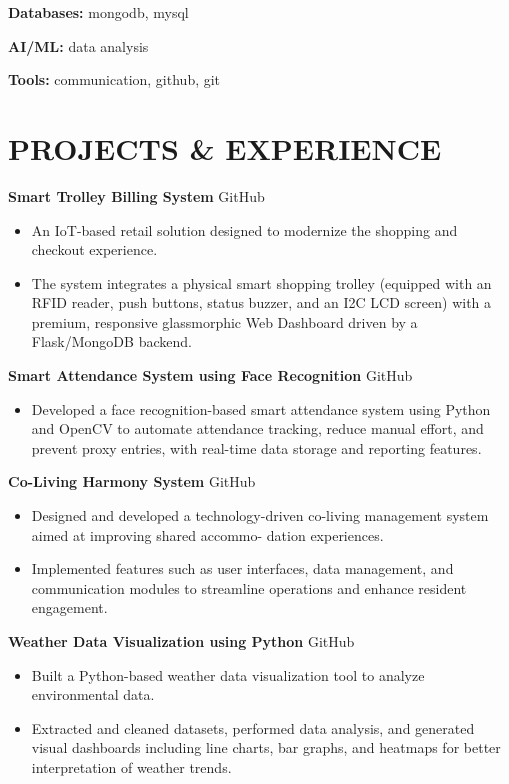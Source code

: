 \documentclass[10pt,a4paper]{extarticle}
\begin{document}
\textbf{Databases:} mongodb, mysql

\textbf{AI/ML:} data analysis

\textbf{Tools:} communication, github, git


\section*{PROJECTS \& EXPERIENCE}

\noindent \textbf{Smart Trolley Billing System} \hfill GitHub
\begin{itemize}[leftmargin=*, parsep=0pt, itemsep=1pt, topsep=1pt]
    \item An IoT-based retail solution designed to modernize the shopping and checkout experience.
    \item The system integrates a physical smart shopping trolley (equipped with an RFID reader, push buttons, status buzzer, and an I2C LCD screen) with a premium, responsive glassmorphic Web Dashboard driven by a Flask/MongoDB backend.
\end{itemize}

\noindent \textbf{Smart Attendance System using Face Recognition} \hfill GitHub
\begin{itemize}[leftmargin=*, parsep=0pt, itemsep=1pt, topsep=1pt]
    \item Developed a face recognition-based smart attendance system using Python and OpenCV to automate attendance tracking, reduce manual effort, and prevent proxy entries, with real-time data storage and reporting features.
\end{itemize}

\noindent \textbf{Co-Living Harmony System} \hfill GitHub
\begin{itemize}[leftmargin=*, parsep=0pt, itemsep=1pt, topsep=1pt]
    \item Designed and developed a technology-driven co-living management system aimed at improving shared accommo- dation experiences.
    \item Implemented features such as user interfaces, data management, and communication modules to streamline operations and enhance resident engagement.
\end{itemize}

\noindent \textbf{Weather Data Visualization using Python} \hfill GitHub
\begin{itemize}[leftmargin=*, parsep=0pt, itemsep=1pt, topsep=1pt]
    \item Built a Python-based weather data visualization tool to analyze environmental data.
    \item Extracted and cleaned datasets, performed data analysis, and generated visual dashboards including line charts, bar graphs, and heatmaps for better interpretation of weather trends.
\end{itemize}
\end{document}
